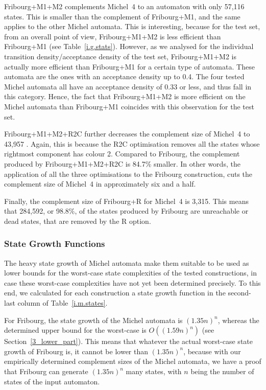 Fribourg+M1+M2 complements Michel~4 to an automaton with only 57,116 states. This is smaller than the complement of Fribourg+M1, and the same applies to the other Michel automata. This is interesting, because for the \goal{} test set,  from an overall point of view, Fribourg+M1+M2 is less efficient than Fribourg+M1 (see Table~\ref{i.g.stats}). However, as we analysed for the individual transition density/acceptance density of the \goal{} test set, Fribourg+M1+M2 is actually more efficient than Fribourg+M1 for a certain type of automata. These automata are the ones with an acceptance density up to 0.4. The four tested Michel automata all have an acceptance density of 0.33 or less, and thus fall in this category. Hence, the fact that Fribourg+M1+M2 is more efficient on the Michel automata than Fribourg+M1 coincides with this observation for the \goal{} test set.

Fribourg+M1+M2+R2C further decreases the complement size of Michel~4 to 43,957
. Again, this is because the R2C optimisation removes all the states whose rightmost component has colour 2. Compared to Fribourg, the complement produced by Fribourg+M1+M2+R2C is 84.7\% smaller. In other words, the application of all the three optimisations to the Fribourg construction, cuts the complement size of Michel~4 in approximately six and a half.

Finally, the complement size of Fribourg+R for Michel~4 is 3,315. This means that 284,592, or 98.8\%, of the states produced by Fribourg are unreachable or dead states, that are removed by the R option.

\subsubsection{State Growth Functions}
The heavy state growth of Michel automata make them suitable to be used as lower bounds for the worst-case state complexities of the tested constructions, in case these worst-case complexities have not yet been determined precisely. To this end, we calculated for each construction a state growth function in the second-last column of Table~\ref{i.m.states}.

For Fribourg, the state growth of the Michel automata is $(1.35n)^n$, whereas the determined upper bound for the worst-case is $O((1.59n)^n)$ (see Section~\ref{3_lower_part}). This means that whatever the actual worst-case state growth of Fribourg is, it cannot be lower than $(1.35n)^n$, because with our empirically determined complement sizes of the Michel automata, we have a proof that Fribourg can generate $(1.35n)^n$ many states, with $n$ being the number of states of the input automaton.

